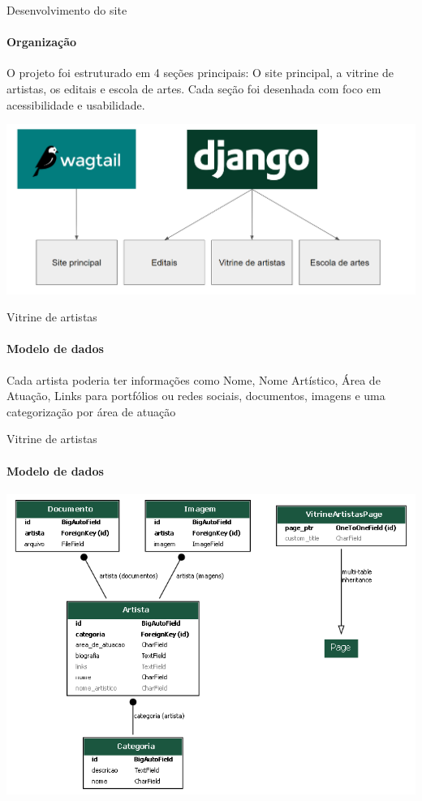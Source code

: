 \begin{frame}{Desenvolvimento do site}
\framesubtitle{Organização}
O projeto foi estruturado em 4 seções principais: O site principal, a vitrine de artistas, os editais e escola de artes. Cada seção foi desenhada com foco em acessibilidade e usabilidade.

\vspace{\baselineskip}

\begin{center}
    \includegraphics[height=0.65\textheight]{beamerthemesrc/assets/organizacao.png}
\end{center}

\end{frame}

\begin{frame}{Vitrine de artistas}
\framesubtitle{Modelo de dados}

Cada artista poderia ter informações como Nome, Nome Artístico, Área de Atuação,
Links para portfólios ou redes sociais, documentos, imagens e uma categorização por área
de atuação
    
\end{frame}

\begin{frame}{Vitrine de artistas}
\framesubtitle{Modelo de dados}

    \begin{center}
        \includegraphics[height=\textheight]{beamerthemesrc/assets/er_diagram_vitrine.png}
    \end{center}

\end{frame}

